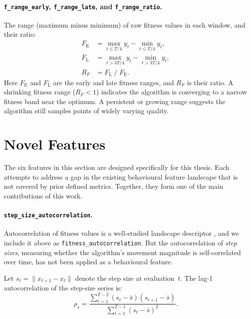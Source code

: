\paragraph{\texttt{f\_range\_early}, \texttt{f\_range\_late}, and
\texttt{f\_range\_ratio}.}
The range (maximum minus minimum) of raw fitness values in each window, and
their ratio:
\begin{align}
\label{eq:frange}
  F_{\mathrm{E}} &= \max_{t \le T/4} y_t
                    - \min_{t \le T/4} y_t, \\
  F_{\mathrm{L}} &= \max_{t > 3T/4} y_t
                    - \min_{t > 3T/4} y_t, \\
  R_F            &= F_{\mathrm{L}} \;/\; F_{\mathrm{E}}.
\end{align}
Here $F_{\mathrm{E}}$ and $F_{\mathrm{L}}$ are the early and late
fitness ranges, and $R_F$ is their ratio.
A shrinking fitness range ($R_F < 1$) indicates the algorithm is
converging
to a narrow fitness band near the optimum. A persistent or growing range
suggests the algorithm still samples points of widely varying quality.

\section{Novel Features}
\label{sec:features:novel}

The six features in this section are designed specifically for this thesis.  Each attempts to address a gap in the existing behavioural feature landscape that is not covered by prior defined metrics.  Together, they form one of the main contributions of this work.

\paragraph{\texttt{step\_size\_autocorrelation}.}
\label{sec:features:novel:ssac}

Autocorrelation of fitness values is a well-studied landscape descriptor
\cite{weinberger1990fitness}, and we include it above as
\texttt{fitness\_autocorrelation}.  But the
autocorrelation of \emph{step sizes}, measuring whether the algorithm's
movement magnitude is self-correlated over time, has not been applied
as a behavioural feature.

Let $s_t = \lVert x_{t+1} - x_t \rVert$ denote the step size at evaluation~$t$.
The lag-1 autocorrelation of the step-size series is:
\begin{equation}
\label{eq:ssac}
  \rho_s
    = \frac{\sum_{t=1}^{T-2}(s_t - \bar{s})(s_{t+1} - \bar{s})}
           {\sum_{t=1}^{T-1}(s_t - \bar{s})^2}.
\end{equation}

